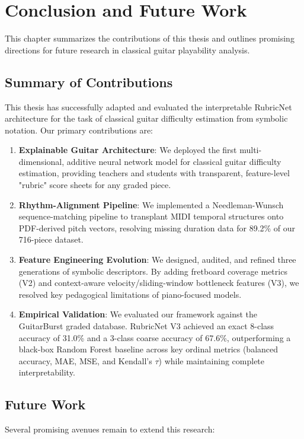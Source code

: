 \chapter{Conclusion and Future Work}
\label{ch:conclusion}

This chapter summarizes the contributions of this thesis and outlines promising directions for future research in classical guitar playability analysis.

\section{Summary of Contributions}
This thesis has successfully adapted and evaluated the interpretable RubricNet architecture for the task of classical guitar difficulty estimation from symbolic notation. Our primary contributions are:
\begin{enumerate}
    \item \textbf{Explainable Guitar Architecture}: We deployed the first multi-dimensional, additive neural network model for classical guitar difficulty estimation, providing teachers and students with transparent, feature-level "rubric" score sheets for any graded piece.
    \item \textbf{Rhythm-Alignment Pipeline}: We implemented a Needleman-Wunsch sequence-matching pipeline to transplant MIDI temporal structures onto PDF-derived pitch vectors, resolving missing duration data for 89.2\% of our 716-piece dataset.
    \item \textbf{Feature Engineering Evolution}: We designed, audited, and refined three generations of symbolic descriptors. By adding fretboard coverage metrics (V2) and context-aware velocity/sliding-window bottleneck features (V3), we resolved key pedagogical limitations of piano-focused models.
    \item \textbf{Empirical Validation}: We evaluated our framework against the GuitarBurst graded database. RubricNet V3 achieved an exact 8-class accuracy of 31.0\% and a 3-class coarse accuracy of 67.6\%, outperforming a black-box Random Forest baseline across key ordinal metrics (balanced accuracy, MAE, MSE, and Kendall's $\tau$) while maintaining complete interpretability.
\end{enumerate}

\section{Future Work}
Several promising avenues remain to extend this research:

